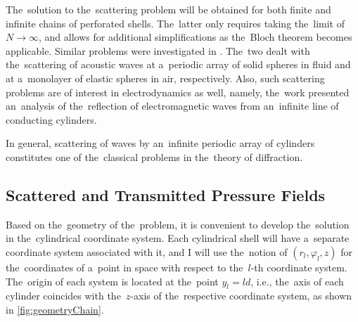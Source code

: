 The~solution to the~scattering problem will be obtained for both finite and infinite chains of perforated shells.
The~latter only requires taking the~limit of $N\rightarrow\infty$, and allows for additional simplifications as the~Bloch theorem becomes applicable.
Similar problems were investigated in \cite{sainidou,zhang}.
The~two dealt with the~scattering of acoustic waves at a~periodic array of solid spheres in fluid and at a~monolayer of elastic spheres in air, respectively.
Also, such scattering problems are of interest in electrodynamics as well, namely, the~work \cite{vergeles} presented an~analysis of the~reflection of electromagnetic waves from an~infinite line of conducting cylinders.

In general, scattering of waves by an~infinite periodic array of cylinders constitutes one of the~classical problems in the~theory of diffraction.




\subsection{Scattered and Transmitted Pressure Fields}

Based on the~geometry of the~problem, it is convenient to develop the~solution in the~cylindrical coordinate system.
Each cylindrical shell will have a~separate coordinate system associated with it, and I will use the~notion of $(r_l,\varphi_l,z)$ for the~coordinates of a~point in space with respect to the~$l$-th coordinate system.
The~origin of each system is located at the~point $y_l=ld$, i.e., the~axis of each cylinder coincides with the~$z$-axis of the~respective coordinate system, as shown in \cref{fig:geometryChain}.


